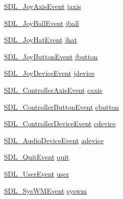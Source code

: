 \begin{DoxyCompactItemize}
\item 
\mbox{\hyperlink{struct_s_d_l___joy_axis_event}{S\+D\+L\+\_\+\+Joy\+Axis\+Event}} \mbox{\hyperlink{union_s_d_l___event_ac4611acd0e9c675e67dc20919f0accb4}{jaxis}}
\item 
\mbox{\hyperlink{struct_s_d_l___joy_ball_event}{S\+D\+L\+\_\+\+Joy\+Ball\+Event}} \mbox{\hyperlink{union_s_d_l___event_ae433f511e3383d17f8fe02df745ee8f8}{jball}}
\item 
\mbox{\hyperlink{struct_s_d_l___joy_hat_event}{S\+D\+L\+\_\+\+Joy\+Hat\+Event}} \mbox{\hyperlink{union_s_d_l___event_a421b40e0f8e01f181c8d5548cff1dd1d}{jhat}}
\item 
\mbox{\hyperlink{struct_s_d_l___joy_button_event}{S\+D\+L\+\_\+\+Joy\+Button\+Event}} \mbox{\hyperlink{union_s_d_l___event_a591104d64903ae1cf70874fb5d3124ff}{jbutton}}
\item 
\mbox{\hyperlink{struct_s_d_l___joy_device_event}{S\+D\+L\+\_\+\+Joy\+Device\+Event}} \mbox{\hyperlink{union_s_d_l___event_a17514dc19a846ea1b5fbe44123700c4c}{jdevice}}
\item 
\mbox{\hyperlink{struct_s_d_l___controller_axis_event}{S\+D\+L\+\_\+\+Controller\+Axis\+Event}} \mbox{\hyperlink{union_s_d_l___event_aa8f6df0f2716fae56204b12ab4a4c289}{caxis}}
\item 
\mbox{\hyperlink{struct_s_d_l___controller_button_event}{S\+D\+L\+\_\+\+Controller\+Button\+Event}} \mbox{\hyperlink{union_s_d_l___event_aee2b5671c8dcdb447023715cc21593cb}{cbutton}}
\item 
\mbox{\hyperlink{struct_s_d_l___controller_device_event}{S\+D\+L\+\_\+\+Controller\+Device\+Event}} \mbox{\hyperlink{union_s_d_l___event_ad3beed01e690b885728e0b0e1d636378}{cdevice}}
\item 
\mbox{\hyperlink{struct_s_d_l___audio_device_event}{S\+D\+L\+\_\+\+Audio\+Device\+Event}} \mbox{\hyperlink{union_s_d_l___event_a111e01fcac4fd8e251a6058ff9f17e72}{adevice}}
\item 
\mbox{\hyperlink{struct_s_d_l___quit_event}{S\+D\+L\+\_\+\+Quit\+Event}} \mbox{\hyperlink{union_s_d_l___event_a102a3008afe67a1c02ae7504e232dcef}{quit}}
\item 
\mbox{\hyperlink{struct_s_d_l___user_event}{S\+D\+L\+\_\+\+User\+Event}} \mbox{\hyperlink{union_s_d_l___event_ab7c394e3ce7bf1e4f8d68bc0e9f1b042}{user}}
\item 
\mbox{\hyperlink{struct_s_d_l___sys_w_m_event}{S\+D\+L\+\_\+\+Sys\+W\+M\+Event}} \mbox{\hyperlink{union_s_d_l___event_ab3b2eaf5348d4c50a51b1f297fdef537}{syswm}}
\item 

\end{DoxyCompactItemize}
